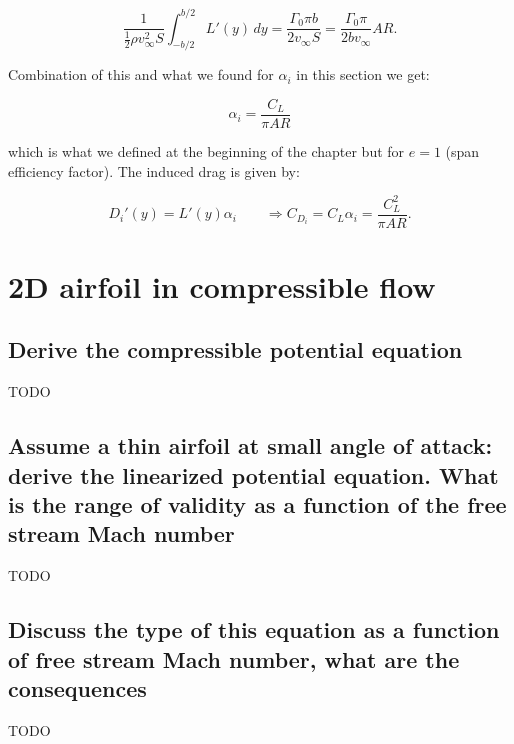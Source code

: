 \documentclass[british,french,11pt, a4paper, openany]{article}
\begin{document}
\begin{equation}
\frac{1}{\frac{1}{2}\rho v_\infty ^2 S} \int _{-b/2}^{b/2} L'(y) \, dy = \frac{\Gamma _0\pi b}{2v_\infty S} = \frac{\Gamma _0 \pi}{2bv_\infty} AR.
\end{equation}

Combination of this and what we found for $\alpha _i$ in this section we get:

\begin{equation}
\alpha _i = \frac{C_L}{\pi AR}
\end{equation}

which is what we defined at the beginning of the chapter but for $e =1$ (span efficiency factor). The induced drag is given by:

\begin{equation}
D_i'(y) = L'(y) \alpha _i \qquad \Rightarrow C_{D_i} = C_L \alpha _i = \frac{C_L^2}{\pi AR}.
\end{equation}



\section{2D airfoil in compressible flow}
\subsection{Derive the compressible potential equation}
TODO

\subsection{Assume a thin airfoil at small angle of attack: derive the linearized potential
	equation. What is the range of validity as a function of the free stream Mach
	number}
TODO

\subsection{Discuss the type of this equation as a function of free stream Mach number,
	what are the consequences}
TODO

\end{document}
